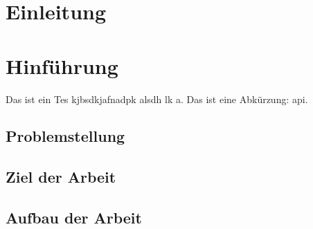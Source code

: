 \section{Einleitung}

\section{Hinführung}
Das ist ein Tes\cite{WasIstKanban} kjbsdkjafnadpk alsdh lk a. Das ist eine Abkürzung: \ac{api}.\autocite[vgl.][S. 20]{book:SimulationMechatronischerSysteme}
    
        
\subsection{Problemstellung}
    
    
\subsection{Ziel der Arbeit}
    
    
\subsection{Aufbau der Arbeit}
    

